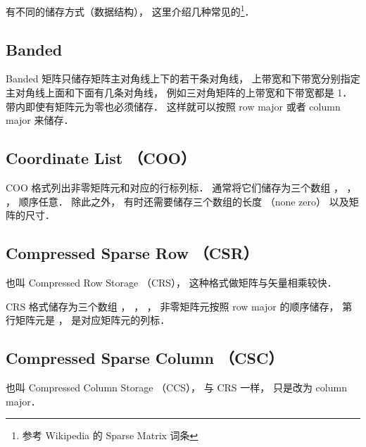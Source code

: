 
有不同的储存方式（数据结构）， 这里介绍几种常见的\footnote{参考 Wikipedia 的 Sparse Matrix 词条}．

\subsection{Banded}
Banded 矩阵只储存矩阵主对角线上下的若干条对角线， 上带宽和下带宽分别指定主对角线上面和下面有几条对角线， 例如三对角矩阵的上带宽和下带宽都是 1． 带内即使有矩阵元为零也必须储存． 这样就可以按照 row major 或者 column major 来储存．

\subsection{Coordinate List （COO）}
COO 格式列出非零矩阵元和对应的行标列标． 通常将它们储存为三个数组 ， ， ， 顺序任意． 除此之外， 有时还需要储存三个数组的长度  （none zero） 以及矩阵的尺寸．

\subsection{Compressed Sparse Row （CSR）}
也叫 Compressed Row Storage （CRS）， 这种格式做矩阵与矢量相乘较快．

CRS 格式储存为三个数组 ， ， ， 非零矩阵元按照 row major 的顺序储存， 第  行矩阵元是 ，  是对应矩阵元的列标．

\subsection{Compressed Sparse Column （CSC）}
也叫 Compressed Column Storage （CCS）， 与 CRS 一样， 只是改为 column major．
